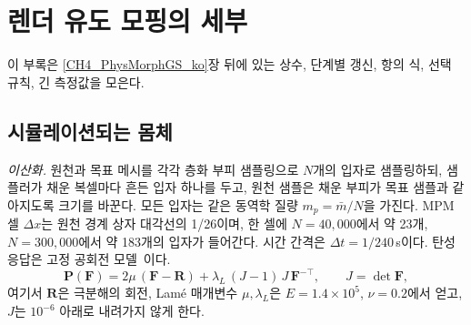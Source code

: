 
\clearpage
\chapter{렌더 유도 모핑의 세부}
\label{app:ch4_ko}

\renewcommand{\theequation}{\thechapter.\arabic{equation}}
\setcounter{equation}{0}

이 부록은 \ref{CH4_PhysMorphGS_ko}장 뒤에 있는 상수, 단계별 갱신, 항의 식, 선택 규칙, 긴 측정값을 모은다.

\section{시뮬레이션되는 몸체}
\label{app:ch4_body_ko}

\textit{이산화.} 원천과 목표 메시를 각각 층화 부피 샘플링으로 $N$개의 입자로 샘플링하되, 샘플러가 채운 복셀마다 흔든 입자
하나를 두고, 원천 샘플은 채운 부피가 목표 샘플과 같아지도록 크기를 바꾼다. 모든 입자는 같은 동역학 질량 $m_p=\bar m/N$을
가진다. MPM 셀 $\Delta x$는 원천 경계 상자 대각선의 1/26이며, 한 셀에 $N=40{,}000$에서 약 23개, $N=300{,}000$에서 약 183개의
입자가 들어간다. 시간 간격은 $\Delta t=1/240$\,s이다. 탄성 응답은 고정 공회전 모델~\citep{2012-FixedCoratedElasticty,stomakhin2013material}이다.
\begin{equation}
\label{eq:fc_stress_ko}
\mathbf{P}(\mathbf{F})=2\mu\,(\mathbf{F}-\mathbf{R})+\lambda_{L}\,(J-1)\,J\,\mathbf{F}^{-\top},
\qquad J=\det\mathbf{F},
\end{equation}
여기서 $\mathbf{R}$은 극분해의 회전, Lam\'e 매개변수 $\mu,\lambda_L$은 $E=1.4\times10^{5}$, $\nu=0.2$에서 얻고, $J$는
$10^{-6}$ 아래로 내려가지 않게 한다.

